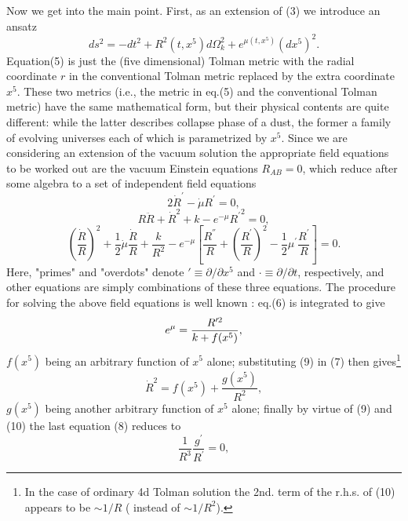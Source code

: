 \documentclass[a4paper,12pt]{article}
\begin{document}
Now we get into the main point. First, as an extension of (3) we
introduce an ansatz
\begin{equation}
ds^2= -dt^2 + R^2(t, x^5)d\Omega^2_k + e^{\mu(t,x^5)}(dx^5)^2 .
\end{equation}
Equation(5) is just the (five dimensional) Tolman metric with the
radial coordinate $r$ in the conventional Tolman metric replaced
by the extra coordinate $x^5$. These two metrics (i.e., the metric
in eq.(5) and the conventional Tolman metric) have the same
mathematical form, but their physical contents are quite
different: while the latter describes collapse phase of a dust,
the former a family of evolving universes each of which is
parametrized by $x^5$. Since we are considering an extension of
the vacuum solution the appropriate field equations to be worked
out are the vacuum Einstein equations $R_{AB} =0$, which reduce
after some algebra to a set of independent field equations
\begin{equation}
2\dot{R}^{\prime} - \dot{\mu}R^{\prime} = 0 ,
\end{equation}
\begin{equation}
R\ddot{R} + \dot{R}^{2} + k - e^{-\mu}{R^{\prime}}^2 = 0 ,
\end{equation}
\begin{equation}
(\frac{\dot{R}}{R})^2 + \frac{1}{2}\dot{\mu}\frac{\dot{R}}{R} +
\frac{k}{R^2} - e^{-\mu}[\frac{R^{''}}{R} +
(\frac{R^{\prime}}{R})^2 - \frac{1}{2}\mu^{\prime}
\frac{R^{\prime}}{R} ] = 0 .
\end{equation}
Here, "primes" and "overdots" denote $ \prime \equiv \partial /
\partial x^5$ and $ \cdot \equiv \partial /\partial t$,
respectively, and other equations are simply combinations of these
three equations. The procedure for solving the above field
equations is well known \cite{car}: eq.(6) is integrated to give
\begin{equation}
e^{\mu} = \frac{R^{\prime\/ 2}}{k + f(x^5)} ,
\end{equation}
$f(x^5)$ being an arbitrary function of $x^5$ alone; substituting
(9) in (7) then gives\footnote{In the case of ordinary 4d Tolman
solution the 2nd. term of the r.h.s. of (10) appears to be $\sim
1/R$ ( instead of $ \sim 1/R^2$).}
\begin{equation}
\dot{R}^2 =f(x^5) + \frac{g(x^5)}{R^2}  ,
\end{equation}
$g(x^5)$ being another arbitrary function of $x^5$ alone; finally
by virtue of (9) and (10) the last equation (8) reduces to
\begin{equation}
\frac{1}{R^3}\frac{g^{\prime}}{R^\prime} = 0  ,
\end{equation}
\end{document}
